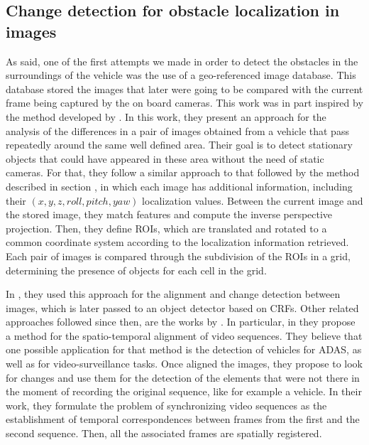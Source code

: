 \subsection{Change detection for obstacle localization in images}\label{ch:chapter01_02_01}

As said, one of the first attempts we made in order to detect the obstacles in the surroundings of the vehicle was the use of a geo-referenced image database. This database stored the images that later were going to be compared with the current frame being captured by the on board cameras. This work was in part inspired by the method developed by \cite{primdahl2005change}. In this work, they present an approach for the analysis of the differences in a pair of images obtained from a vehicle that pass repeatedly around the same well defined area. Their goal is to detect stationary objects that could have appeared in these area without the need of static cameras. For that, they follow a similar approach to that followed by the method described in section , in which each image has additional information, including their $(x, y, z, roll, pitch, yaw)$ localization values. Between the current image and the stored image, they match features and compute the inverse perspective projection. Then, they define \acp{ROI}, which are translated and rotated to a common coordinate system according to the localization information retrieved. Each pair of images is compared through the subdivision of the \acp{ROI} in a grid, determining the presence of objects for each cell in the grid.

In \cite{vallespi2012prior}, they used this approach for the alignment and change detection between images, which is later passed to an object detector based on \ac{CRFs}. Other related approaches followed since then, are the works by \cite{diego2011video, evangelidis2011slice, evangelidis2011efficient}. In particular, in \cite{diego2011video} they propose a method for the spatio-temporal alignment of video sequences. They believe that one possible application for that method is the detection of vehicles for \ac{ADAS}, as well as for video-surveillance tasks. Once aligned the images, they propose to look for changes and use them for the detection of the elements that were not there in the moment of recording the original sequence, like for example a vehicle. In their work, they formulate the problem of synchronizing video sequences as the establishment of temporal correspondences between frames from the first and the second sequence. Then, all the associated frames are spatially registered.

